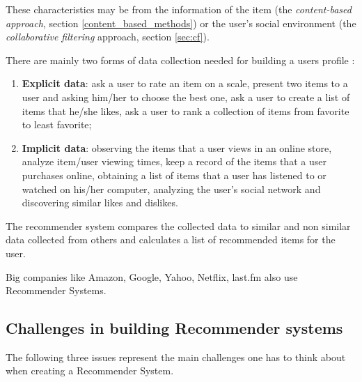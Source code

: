 \documentclass[10pt,a4paper]{article}  %
\begin{document}
These characteristics may be from the information of the item (the \emph{content-based approach}, section \ref{content_based_methods}) or the user's social environment (the \emph{collaborative filtering} approach, section \ref{sec:cf}).

There are mainly two forms of data collection needed for building a users profile \cite{wikipedia_rec_syst_def}:
\begin{enumerate}
  \item \textbf{Explicit data}: ask a user to rate an item on a scale, present two items to a user and asking him/her to choose the best one, ask a user to create a list of items that he/she likes, ask a user to rank a collection of items from favorite to least favorite;
  \item \textbf{Implicit data}: observing the items that a user views in an online store, analyze item/user viewing times, keep a record of the items that a user purchases online, obtaining a list of items that a user has listened to or watched on his/her computer, analyzing the user's social network and discovering similar likes and dislikes.
\end{enumerate}

The recommender system compares the collected data to similar and non similar data collected from others and calculates a list of recommended items for the user.

Big companies like Amazon, Google, Yahoo, Netflix, last.fm also use Recommender Systems.

\subsection{Challenges in building Recommender systems}
 The following three issues represent the main challenges one has to think about when creating a Recommender System.
 
\end{document}
